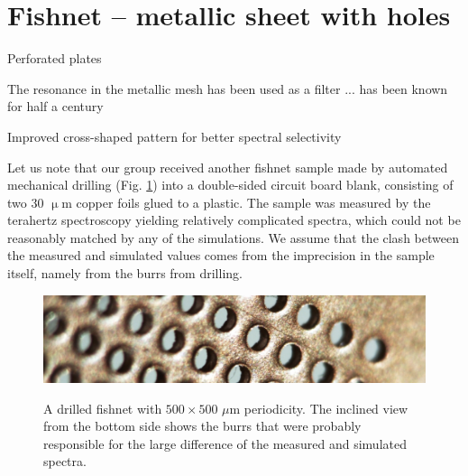 \FloatBarrier %
\section{Fishnet -- metallic sheet with holes} \label{section_fishnet} %
Perforated plates \cite[p. 58]{brown1953artificial} %






\cite{yahiaoui2012metallo,rockstuhl2008light}

The resonance in the metallic mesh has been used as a filter 
\cite{ulrich1967effective,ulrich1967far}
... has been known for half a century \cite{vogel1964transmission}

Improved cross-shaped pattern for better spectral selectivity \cite{porterfield1994resonant}

Let us note that our group received another fishnet sample made by automated mechanical drilling (Fig. \ref{fg_fishnet_mechanical}) into a double-sided circuit board blank, consisting of two 30 $\upmu$m copper foils glued to a plastic. The sample was measured by the terahertz spectroscopy yielding relatively complicated spectra, which could not be reasonably matched by any of the simulations. We assume that the clash between the measured and simulated values comes from the imprecision in the sample itself, namely from the burrs from drilling.
\begin{figure}[ht] \caption{A drilled fishnet with $500\times 500$ $\mu$m periodicity. The inclined view from the bottom side shows the burrs that were probably responsible for the large difference of the measured and simulated spectra.}  \centering \includegraphics[width=.8\textwidth]{img/fishnet.pdf} \label{fg_fishnet_mechanical} \end{figure}

